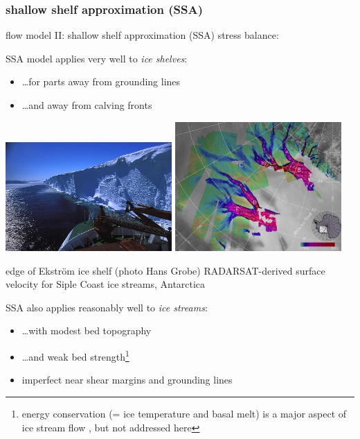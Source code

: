 \documentclass[titlepage,letterpaper,final,12pt]{scrartcl}
\newcommand{\alert}[1]{\emph{#1}}
\begin{document}
\subsubsection*{shallow shelf approximation (SSA)}

flow model II: shallow shelf approximation (SSA) stress balance:
  
SSA model applies very well to \alert{ice shelves}:
\begin{itemize}
\item \dots for parts away from grounding lines
\item \dots and away from calving fronts
\end{itemize}

\begin{center}
\includegraphics[width=2.5in]{ice_shelf_edge_hg}
\quad
\includegraphics[width=2.5in]{siple}

edge of Ekstr\"om ice shelf (photo Hans Grobe) \qquad RADARSAT-derived surface velocity for Siple Coast ice streams, Antarctica
\end{center}

SSA also applies reasonably well to \alert{ice streams}:
\begin{itemize}
\item \dots with modest bed topography
\item \dots and weak bed strength\footnote{energy conservation (= ice temperature and basal melt) is a major aspect of ice stream flow \cite{Raymondenergy}, but not addressed here}
\item imperfect near shear margins and grounding lines
\end{itemize}
\end{document}
